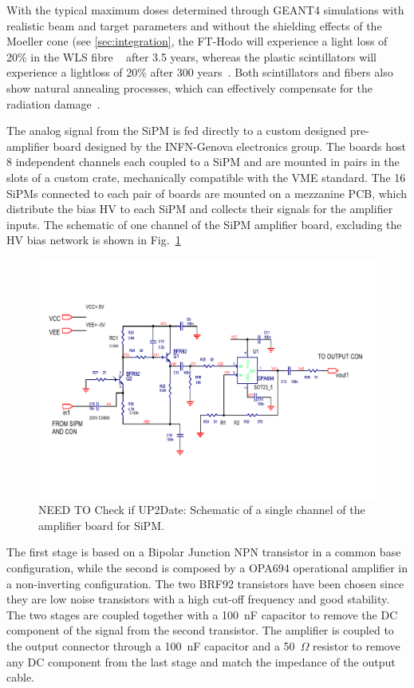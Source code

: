 With the typical maximum doses determined through GEANT4 simulations with realistic beam and target parameters and without the shielding effects of the Moeller cone (see \ref{sec:integration}, the FT-Hodo will experience a light loss of 20\% in the WLS fibre ~\cite{TDR42} after 3.5 years, whereas the plastic scintillators will experience a lightloss of 20\% after 300 years~\cite{TDR41}. Both scintillators and fibers also show natural annealing processes, which can effectively compensate for the radiation damage~\cite{TDR43}.  

The analog signal from the SiPM is fed directly to a custom designed pre-amplifier board designed by the INFN-Genova electronics group. The boards host 8 independent channels each coupled to a SiPM and are mounted in pairs in the slots of a custom crate, mechanically compatible with the VME standard. The 16 SiPMs connected to each pair of boards are mounted on a mezzanine PCB, which distribute the bias HV to each SiPM and collects their signals for the amplifier inputs. The schematic of one channel of the SiPM amplifier board, excluding the HV bias network is shown in Fig.~\ref{Fig:FTHODOAmpBoard}  
\begin{figure}[th!]
\centering 
\includegraphics[width=0.95\columnwidth]{./fig/FTHODOAmpBoard.pdf} 
\caption{NEED TO Check if UP2Date: Schematic of a single channel of the amplifier board for SiPM.} 
\label{Fig:FTHODOAmpBoard} 
\end{figure}
The first stage is based on a Bipolar Junction NPN transistor in a common base configuration, while the second is composed by a OPA694 operational amplifier in a non-inverting configuration. The two BRF92 transistors have been chosen since they are low noise transistors with a high cut-off frequency and good stability. The two stages are coupled together with a 100~nF capacitor to remove the DC component of the signal from the second transistor. The amplifier is coupled to the output connector through a 100~nF capacitor and a 50~$\Omega$ resistor to remove any DC component from the last stage and match the impedance of the output cable. 


